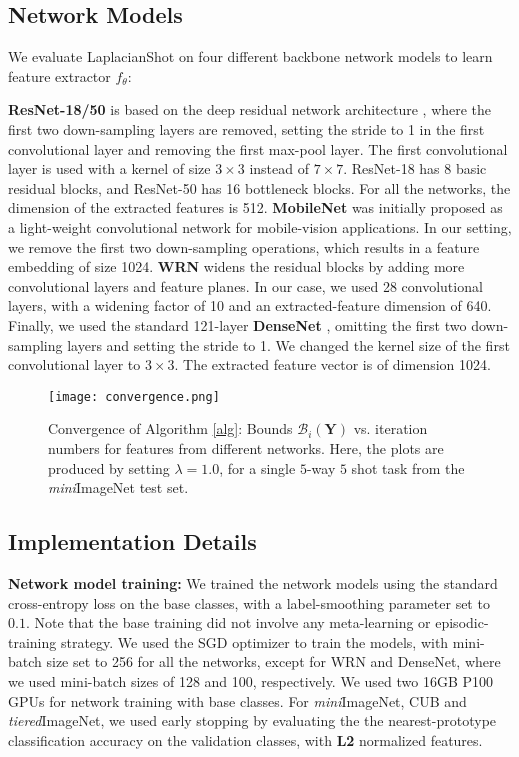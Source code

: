 \documentclass{article}
\newcommand{\ftheta}{f_{\theta}}
\newcommand{\Bcal}{\mathcal{B}}
\newcommand{\YY}{\mathbf Y}
\begin{document}
\subsection{Network Models}
We evaluate LaplacianShot on four different backbone network models to learn feature extractor $\ftheta$: 

\textbf{ResNet-18/50} is based on the deep residual network architecture \cite{he2016deep}, where the first two down-sampling layers are removed, setting the stride to 1 in the first convolutional layer and removing the first max-pool layer. The first convolutional layer is used with a kernel of size $3 \times 3$ instead of $7 \times 7$. ResNet-18 has 8 basic residual blocks, and  ResNet-50 has 16 bottleneck blocks. For all the networks, the dimension of the extracted features is 512. \textbf{MobileNet} \cite{mobilenet} was initially proposed as a light-weight convolutional network for mobile-vision applications. In our setting, we remove the first two down-sampling operations, which results in a feature embedding of size 1024. \textbf{WRN} \cite{WRN} widens the residual blocks by adding more convolutional layers and feature planes. In our case, we used 28 convolutional layers, with a widening factor of 10 and an extracted-feature dimension of 640. Finally, we used the standard 121-layer \textbf{DenseNet} \cite{densenet}, omitting the first two down-sampling layers and setting the stride to 1. We changed the kernel size of the first convolutional layer to $3 \times 3$. The extracted feature vector is of dimension 1024.

\begin{figure*}[tb]
\vskip 0.1in
\begin{center}
\centerline{\texttt{[image: convergence.png]}}
\caption{Convergence of Algorithm \ref{alg}:  Bounds $\Bcal_i(\YY)$ vs. iteration numbers for features from different networks. Here, the plots are produced by setting $\lambda=1.0$, for a single $5$-way $5$ shot task from the \textit{mini}ImageNet test set.}
\label{fig:convergence}
\end{center}
\vskip -0.1in
\end{figure*}

\subsection{Implementation Details}
\textbf{Network model training:} We trained the network models using the standard cross-entropy loss on the base classes, with a label-smoothing \cite{szegedy2016rethinking} parameter set to $0.1$.
Note that the base training did not involve any meta-learning or episodic-training strategy. 
We used the SGD optimizer to train the models, with  
mini-batch size set to 256 for all the networks, except for WRN and DenseNet, where we used mini-batch sizes of 128 and 100, respectively. We used two 16GB P100 GPUs for network training with base classes. 
For \textit{mini}ImageNet, CUB and \textit{tiered}ImageNet, we used early stopping by evaluating the the nearest-prototype classification accuracy on the validation classes, with \textbf{L2} normalized features.
\end{document}
